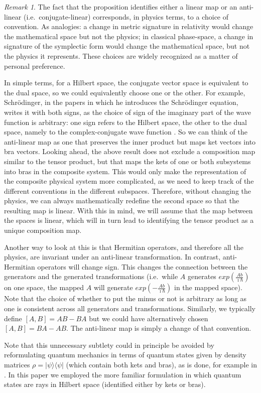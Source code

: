 \documentclass[aps,prl,amsmath,amssymb,twocolumn,nofootinbib]{revtex4}
\theoremstyle{plain}
\theoremstyle{definition}
\theoremstyle{remark}
\newtheorem*{remark}{Remark}
\def\>{\rangle}
\def\<{\langle}
\begin{document}
	\begin{remark}
		The fact that the proposition identifies either a linear map or an anti-linear (i.e.~conjugate-linear) corresponds, in physics terms, to a choice of convention. As analogies: a change in metric signature in relativity would change the mathematical space but not the physics; in classical phase-space, a change in signature of the symplectic form would change the mathematical space, but not the physics it represents. These choices are widely recognized as a matter of personal preference.
		
		In simple terms, for a Hilbert space, the conjugate
		vector space is equivalent to the dual space, so we
		could equivalently choose one or the other. For
		example, Schr\"odinger, in the papers in which he
		introduces the Schr\"odinger equation, writes it
		with both signs, as the choice of sign of the imaginary part of the wave function is arbitrary: one sign refers to
		the Hilbert space, the other to the dual space, namely
		to the complex-conjugate wave function \cite{sch}. So we can think of the anti-linear map as one that preserves the inner product but maps ket vectors into bra vectors. Looking ahead, the above result does not exclude a composition map similar to the tensor product, but that maps the kets of one or both subsystems into bras in the composite system. This would only make the representation of the composite physical system more complicated, as we need to keep track of the different conventions in the different subspaces. Therefore, without changing the physics, we can always mathematically redefine the second space so that the resulting map is linear. With this in mind, we will assume that the map between the spaces is linear, which will in turn lead to identifying the tensor product as a unique composition map.
		
		Another way to look at this is that Hermitian operators, and therefore all 
		the physics, are invariant under an anti-linear transformation.
		In contrast, anti-Hermitian operators will change sign. This 
		changes the connection between the generators and the generated 
		transformations (i.e.~while $A$ generates $exp(\frac{Ab}{\imath\hbar})$ 
		on one space, the mapped $A$ will generate 
		$exp(-\frac{Ab}{\imath\hbar})$ in the mapped space). Note that the 
		choice of whether to put the minus or not is arbitrary as long as one is consistent across all generators and transformations.
		Similarly, we typically define $[A, B] = AB - BA$ but we could have 
		alternatively chosen $[A, B] = BA - AB$. The anti-linear map is simply 
		a change of that convention.
		
		Note that this unnecessary subtlety could in principle be avoided by
		reformulating quantum mechanics in terms of quantum states given by
		density matrices $\rho=|\psi\>\<\psi|$ (which contain both  kets and
		bras), as is done, for example in \cite{ozawa,holevo}. In this paper
		we employed the more familiar formulation in which quantum states are
		rays in Hilbert space (identified either by kets or bras).
	\end{remark}
	
\end{document}
